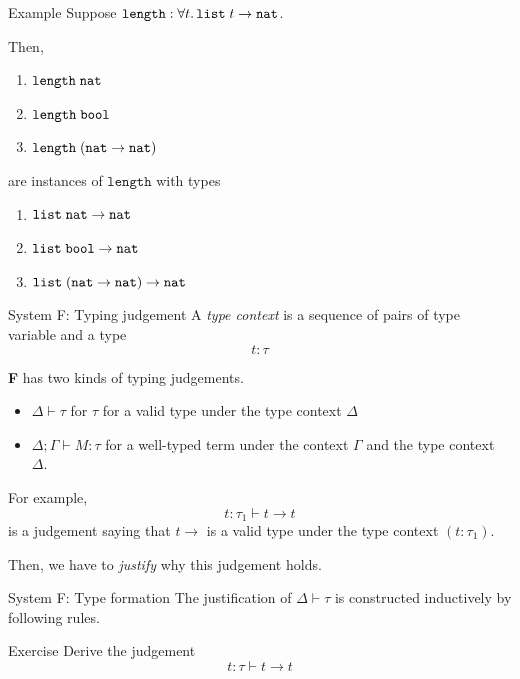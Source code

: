 \begin{frame}{Example}
  Suppose $\mathtt{length} : \forall t.\,\List\;t \to \nat$. 

  Then, 
  \begin{enumerate}
    \item $\mathtt{length}\;\nat$
    \item $\mathtt{length}\;\bool$
    \item $\mathtt{length}\;(\nat \to \nat)$
  \end{enumerate}
  are instances of $\mathtt{length}$ with types
  \begin{enumerate}
     \item $\List\; \nat \to \nat$
     \item $\List\;\bool \to \nat$
     \item $\List\;(\nat \to \nat) \to \nat$
  \end{enumerate}
\end{frame}

\begin{frame}{System F: Typing judgement}
  A \emph{type context} is a sequence of pairs of type variable and a type
  \[
    t : \tau
  \]

  \textbf{F} has two kinds of typing judgements.
  \begin{itemize}
    \item $\Delta \vdash \tau$ for $\tau$ for a valid type under the type context $\Delta$
    \item $\Delta; \Gamma \vdash M : \tau$ for a well-typed term under the context $\Gamma$ and the type context~$\Delta$.
  \end{itemize}
  For example,
    \[
      t : \tau_1 \vdash t \to t
    \]
    is a judgement saying that $t \to $ is a valid type under the type context $(t : \tau_1)$.

    Then, we have to \emph{justify} why this judgement holds.
\end{frame}

\begin{frame}{System F: Type formation}
  The justification of $\Delta \vdash \tau$ is constructed inductively by following rules.
  \begin{multicols}{2}
    \begin{prooftree}
    \end{prooftree}
    \begin{prooftree}
    \end{prooftree}
    \columnbreak
    \begin{prooftree}
    \end{prooftree}
  \end{multicols}

  \begin{block}{Exercise}
    Derive the judgement 
    \[
        t : \tau \vdash t \to t
    \]
  \end{block}
\end{frame}

